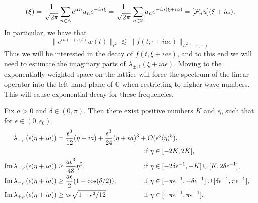 \begin{equation*} 
	[\mcF_n v] (\xi) = \frac 1 {\sqrt{2\pi}} \sum_{n\in\Z} e^{\alpha n} u_n e^{-in\xi} =  \frac 1 {\sqrt{2\pi}} \sum_{n\in\Z}  u_n e^{-in(\xi+i\alpha)} = [\mcF_n u](\xi + i \alpha ).
\end{equation*}  
In particular, we have that
\begin{equation*} 
	\|e^{\epsilon a(\cdot + c_\epsilon t)} w(t) \|_{\ell^2} \lesssim \| f(t, \cdot +ia\epsilon) \|_{L^2(-\pi, \pi)}
\end{equation*} 
Thus we will be interested in the decay of \(f(t, \xi + ia\epsilon)\), and to this end we will need to estimate the imaginary parts of \(\lambda_{\pm,\epsilon}(\xi + ia\epsilon)\). Moving to the exponentially weighted space on the lattice will force the spectrum of the linear operator into the left-hand plane of \(\mathbb C\) when restricting to higher wave numbers. This will cause exponential decay for these frequencies.

\begin{lem}\label{linear-frequency}
	Fix \(a> 0\) and \(\delta \in (0,\pi)\). Then there exist positive numbers \(K\) and \(\epsilon_0\) such that for \(\epsilon\in(0,\epsilon_0)\),
	\begin{align*}
		\lambda_{-, \epsilon}(\epsilon(\eta + ia)) &= \frac{\epsilon^3}{12}(\eta + ia) + \frac{\epsilon^3}{24}(\eta + ia)^3 + \mathcal O(\epsilon^5\langle \eta \rangle^5), \\
		 & &&\hspace{-6em}\text{if } \eta\in[-2K, 2K], \\
		\Im \lambda_{-,\epsilon}(\epsilon(\eta + ia)) &\geq \frac{a \epsilon^3}{48} \eta^2, &&\hspace{-6em}\text{if } \eta\in[-2\delta\epsilon^{-1}, -K] \cup [K, 2\delta \epsilon^{-1}], \\
		\Im \lambda_{-,\epsilon}(\epsilon(\eta + ia)) &\geq \frac{a\epsilon}2(1-\cos(\delta / 2)), &&\hspace{-6em}\text{if } \eta\in[-\pi\epsilon^{-1}, - \delta \epsilon^{-1}] \cup [\delta\epsilon^{-1}, \pi\epsilon^{-1}], \\
		\Im \lambda_{+,\epsilon}(\epsilon(\eta + ia)) &\geq a\epsilon\sqrt{1-\epsilon^2/12} &&\hspace{-6em}\text{if } \eta\in [-\pi \epsilon^{-1}, \pi \epsilon^{-1}].
	\end{align*}
\end{lem}

